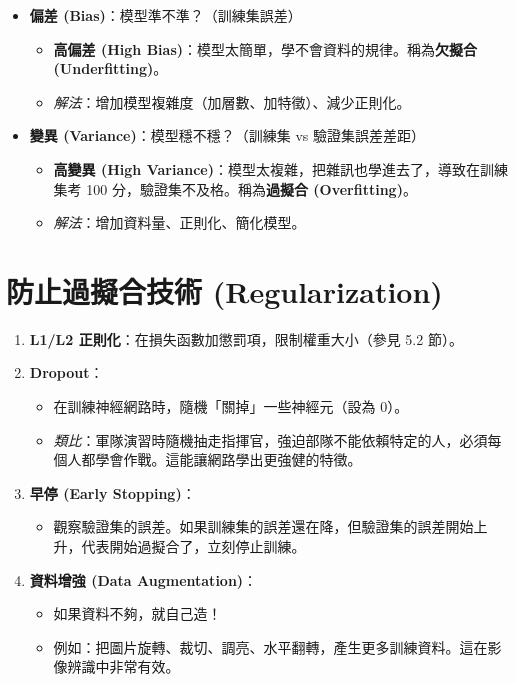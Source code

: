 \documentclass[
  letterpaper,
  DIV=11,
  numbers=noendperiod]{scrreprt}
\providecommand{\tightlist}{%
  \setlength{\itemsep}{0pt}\setlength{\parskip}{0pt}}
\begin{document}
\begin{itemize}
\tightlist
\item
  \textbf{偏差 (Bias)}：模型準不準？（訓練集誤差）

  \begin{itemize}
  \tightlist
  \item
    \textbf{高偏差 (High
    Bias)}：模型太簡單，學不會資料的規律。稱為\textbf{欠擬合
    (Underfitting)}。
  \item
    \emph{解法}：增加模型複雜度（加層數、加特徵）、減少正則化。
  \end{itemize}
\item
  \textbf{變異 (Variance)}：模型穩不穩？（訓練集 vs 驗證集誤差差距）

  \begin{itemize}
  \tightlist
  \item
    \textbf{高變異 (High
    Variance)}：模型太複雜，把雜訊也學進去了，導致在訓練集考 100
    分，驗證集不及格。稱為\textbf{過擬合 (Overfitting)}。
  \item
    \emph{解法}：增加資料量、正則化、簡化模型。
  \end{itemize}
\end{itemize}

\section{防止過擬合技術 (Regularization)}\label{sec-prevent-overfitting}

\begin{enumerate}
\def\labelenumi{\arabic{enumi}.}
\tightlist
\item
  \textbf{L1/L2 正則化}：在損失函數加懲罰項，限制權重大小（參見 5.2
  節）。
\item
  \textbf{Dropout}：

  \begin{itemize}
  \tightlist
  \item
    在訓練神經網路時，隨機「關掉」一些神經元（設為 0）。
  \item
    \emph{類比}：軍隊演習時隨機抽走指揮官，強迫部隊不能依賴特定的人，必須每個人都學會作戰。這能讓網路學出更強健的特徵。
  \end{itemize}
\item
  \textbf{早停 (Early Stopping)}：

  \begin{itemize}
  \tightlist
  \item
    觀察驗證集的誤差。如果訓練集的誤差還在降，但驗證集的誤差開始上升，代表開始過擬合了，立刻停止訓練。
  \end{itemize}
\item
  \textbf{資料增強 (Data Augmentation)}：

  \begin{itemize}
  \tightlist
  \item
    如果資料不夠，就自己造！
  \item
    例如：把圖片旋轉、裁切、調亮、水平翻轉，產生更多訓練資料。這在影像辨識中非常有效。
  \end{itemize}
\end{enumerate}
\end{document}
